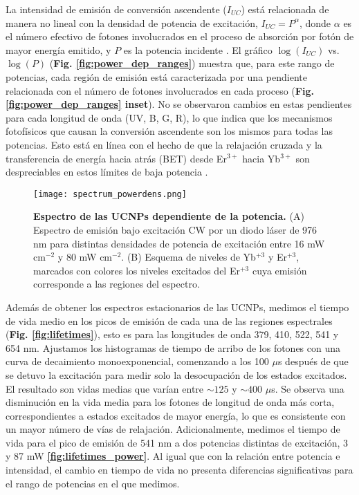 La intensidad de emisión de conversión ascendente ($I_{UC}$) está relacionada de manera no lineal con la densidad de potencia de excitación, $I_{UC} = P^\alpha$, donde $\alpha$ es el número efectivo de fotones involucrados en el proceso de absorción por fotón de mayor energía emitido, y $P$ es la potencia incidente \cite{Auzel2004}.  
El gráfico $\log{(I_{UC})}$ vs. $\log{(P)}$ (\textbf{Fig. \ref{fig:power_dep_ranges}}) muestra que, para este rango de potencias, cada región de emisión está caracterizada por una pendiente relacionada con el número de fotones involucrados en cada proceso (\textbf{Fig. \ref{fig:power_dep_ranges} inset}).  
No se observaron cambios en estas pendientes para cada longitud de onda (UV, B, G, R), lo que indica que los mecanismos fotofísicos que causan la conversión ascendente son los mismos para todas las potencias.  
Esto está en línea con el hecho de que la relajación cruzada y la transferencia de energía hacia atrás (BET) desde Er$^{3+}$ hacia Yb$^{3+}$ son despreciables en estos límites de baja potencia \cite{suyver_anomalous_2005} \cite{berry_disputed_2015}.

\begin{figure}
    \centering
    \texttt{[image: spectrum\_powerdens.png]}
    \caption{\textbf{Espectro de las UCNPs dependiente de la potencia.} (A) Espectro de emisión bajo excitación CW por un diodo láser de 976 nm para distintas densidades de potencia de excitación entre 16 mW cm$^{-2}$ y 80 mW cm$^{-2}$.
    (B) Esquema de niveles de Yb$^{+3}$ y Er$^{+3}$, marcados con colores los niveles excitados del Er$^{+3}$ cuya emisión corresponde a las regiones del espectro.}
    \label{fig:power_dep_spectrum}
\end{figure}

Además de obtener los espectros estacionarios de las UCNPs, medimos el tiempo de vida medio en los picos de emisión de cada una de las regiones espectrales (\textbf{Fig. \ref{fig:lifetimes}}), esto es para las longitudes de onda 379, 410, 522, 541 y 654 nm.
Ajustamos los histogramas de tiempo de arribo de los fotones con una curva de decaimiento monoexponencial, comenzando a los 100 $\mu$s después de que se detuvo la excitación para medir solo la desocupación de los estados excitados.  
El resultado son vidas medias que varían entre $\sim125$ y $\sim400$ $\mu$s.  
Se observa una disminución en la vida media para los fotones de longitud de onda más corta, correspondientes a estados excitados de mayor energía, lo que es consistente con un mayor número de vías de relajación. 
Adicionalmente, medimos el tiempo de vida para el pico de emisión de 541 nm a dos potencias distintas de excitación, 3 y 87 mW \textbf{\ref{fig:lifetimes_power}}.
Al igual que con la relación entre potencia e intensidad, el cambio en tiempo de vida no presenta diferencias significativas para el rango de potencias en el que medimos.

